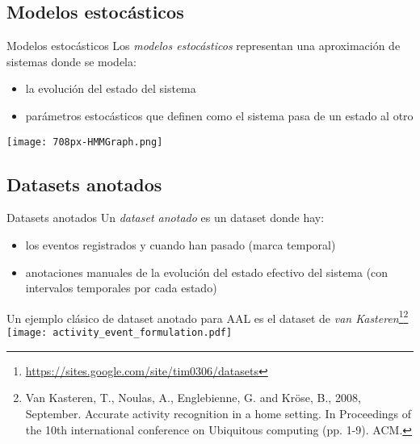\documentclass[9pt, handout]{beamer}
\begin{document}
    \subsection{Modelos estocásticos}
      \begin{frame}{Modelos estocásticos}
        Los \textit{modelos estocásticos} representan una aproximación de sistemas donde se modela:
        \begin{itemize}
          \item la evolución del estado del sistema
          \item parámetros estocásticos que definen como el sistema pasa de un estado al otro
        \end{itemize}
        \begin{center}
          \colorbox{white}{\texttt{[image: 708px-HMMGraph.png]}}
        \end{center}
      \end{frame}
    
    \subsection{Datasets anotados}
      \begin{frame}{Datasets anotados}
        Un \textit{dataset anotado} es un dataset donde hay:
        \begin{itemize}
          \item los eventos registrados y cuando han pasado (marca temporal)
          \item anotaciones manuales de la evolución del estado efectivo del sistema (con intervalos temporales por cada estado)
        \end{itemize}
        Un ejemplo clásico de dataset anotado para AAL es el dataset de \textit{van Kasteren}\footnote{\url{https://sites.google.com/site/tim0306/datasets}}\footnote{Van Kasteren, T., Noulas, A., Englebienne, G. and Kröse, B., 2008, September. Accurate activity recognition in a home setting. In Proceedings of the 10th international conference on Ubiquitous computing (pp. 1-9). ACM.}\\[1em]
        
        \texttt{[image: activity\_event\_formulation.pdf]}
      \end{frame}
    
\end{document}
